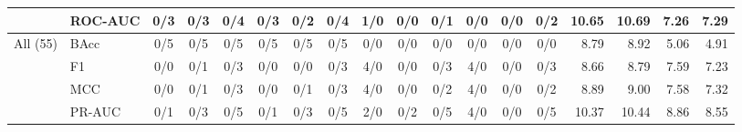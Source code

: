 \begin{table}[!htbp]
\begin{adjustbox}{max width=\linewidth}
\begin{tabular}{llccccccccccccrrrr}
 & ROC-AUC & 0/3 & 0/3 & 0/4 & 0/3 & 0/2 & 0/4 & 1/0 & 0/0 & 0/1 & 0/0 & 0/0 & 0/2 & 10.65 & 10.69 & 7.26 & 7.29 \\
\midrule
All (55) & BAcc & 0/5 & 0/5 & 0/5 & 0/5 & 0/5 & 0/5 & 0/0 & 0/0 & 0/0 & 0/0 & 0/0 & 0/0 & 8.79 & 8.92 & 5.06 & 4.91 \\
 & F1 & 0/0 & 0/1 & 0/3 & 0/0 & 0/0 & 0/3 & 4/0 & 0/0 & 0/3 & 4/0 & 0/0 & 0/3 & 8.66 & 8.79 & 7.59 & 7.23 \\
 & MCC & 0/0 & 0/1 & 0/3 & 0/0 & 0/1 & 0/3 & 4/0 & 0/0 & 0/2 & 4/0 & 0/0 & 0/2 & 8.89 & 9.00 & 7.58 & 7.32 \\
 & PR-AUC & 0/1 & 0/3 & 0/5 & 0/1 & 0/3 & 0/5 & 2/0 & 0/2 & 0/5 & 4/0 & 0/0 & 0/5 & 10.37 & 10.44 & 8.86 & 8.55 \\
\bottomrule
\end{tabular}
\end{adjustbox}
\end{table}
